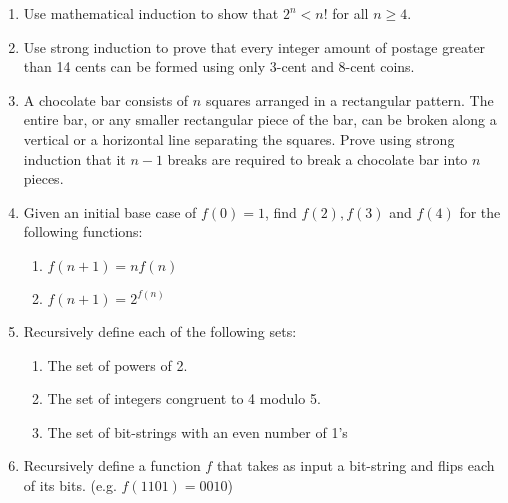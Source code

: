 \begin{enumerate}
\begin{solution}
\begin{enumerate}
\begin{tabular}{c|c}
    \end{tabular}
\end{enumerate}
\end{solution}

\item Use mathematical induction to show that $2^n < n!$ for all $n \geq 4$. 

\item Use strong induction to prove that every integer amount of postage greater than 14 cents can be formed using only 3-cent and 8-cent coins. 

\item A chocolate bar consists of $n$ squares arranged in a rectangular pattern. The entire bar, or any smaller rectangular piece of the bar, can be broken along a vertical or a horizontal line separating the squares. Prove using strong induction that it $n-1$ breaks are required to break a chocolate bar into $n$ pieces. 

\item Given an initial base case of $f(0)=1$, find $f(2), f(3)$ and $f(4)$ for the following functions: 
\begin{enumerate}
    \item $f(n + 1) = nf(n)$
    \item $f(n + 1) = 2^{f(n)}$
\end{enumerate}

\item Recursively define each of the following sets: 
\begin{enumerate}
    \item The set of powers of 2.
    \item The set of integers congruent to 4 modulo 5.
    \item The set of bit-strings with an even number of 1's
\end{enumerate}

\item Recursively define a function $f$ that takes as input a bit-string and flips each of its bits. (e.g. $f(1101)=0010$) 



\end{enumerate}